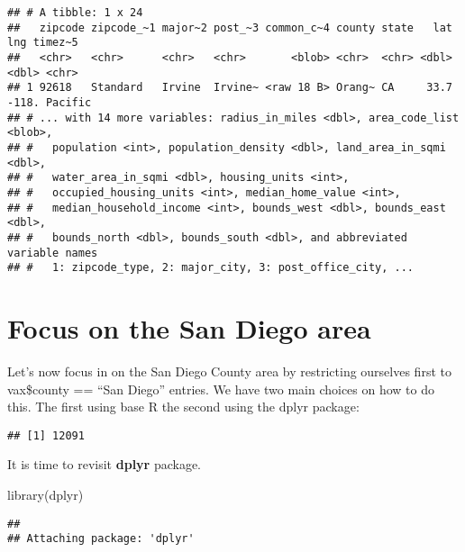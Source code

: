 \documentclass[
]{article}
\newenvironment{Shaded}{\begin{snugshade}}{\end{snugshade}}
\newcommand{\FunctionTok}[1]{\textcolor[rgb]{0.00,0.00,0.00}{#1}}
\newcommand{\NormalTok}[1]{#1}
\newcommand{\OtherTok}[1]{\textcolor[rgb]{0.56,0.35,0.01}{#1}}
\newcommand{\SpecialCharTok}[1]{\textcolor[rgb]{0.00,0.00,0.00}{#1}}
\newcommand{\StringTok}[1]{\textcolor[rgb]{0.31,0.60,0.02}{#1}}
\begin{document}
\begin{verbatim}
## # A tibble: 1 x 24
##   zipcode zipcode_~1 major~2 post_~3 common_c~4 county state   lat   lng timez~5
##   <chr>   <chr>      <chr>   <chr>       <blob> <chr>  <chr> <dbl> <dbl> <chr>  
## 1 92618   Standard   Irvine  Irvine~ <raw 18 B> Orang~ CA     33.7 -118. Pacific
## # ... with 14 more variables: radius_in_miles <dbl>, area_code_list <blob>,
## #   population <int>, population_density <dbl>, land_area_in_sqmi <dbl>,
## #   water_area_in_sqmi <dbl>, housing_units <int>,
## #   occupied_housing_units <int>, median_home_value <int>,
## #   median_household_income <int>, bounds_west <dbl>, bounds_east <dbl>,
## #   bounds_north <dbl>, bounds_south <dbl>, and abbreviated variable names
## #   1: zipcode_type, 2: major_city, 3: post_office_city, ...
\end{verbatim}

\hypertarget{focus-on-the-san-diego-area}{%
\section{Focus on the San Diego
area}\label{focus-on-the-san-diego-area}}

Let's now focus in on the San Diego County area by restricting ourselves
first to vax\$county == ``San Diego'' entries. We have two main choices
on how to do this. The first using base R the second using the dplyr
package:

\begin{Shaded}
\end{Shaded}

\begin{verbatim}
## [1] 12091
\end{verbatim}

It is time to revisit \textbf{dplyr} package.

\begin{Shaded}
\begin{Highlighting}[]
\FunctionTok{library}\NormalTok{(dplyr)}
\end{Highlighting}
\end{Shaded}

\begin{verbatim}
## 
## Attaching package: 'dplyr'
\end{verbatim}
\end{document}
